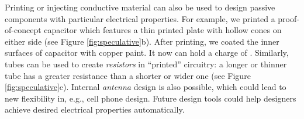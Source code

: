 Printing or injecting conductive material can also be used to design passive components with particular electrical properties. For example, we printed a proof-of-concept  capacitor which features a thin printed plate with hollow cones on either side (see Figure \ref{fig:speculative}b).  After printing, we coated the inner surfaces of capacitor with copper paint.  It now can hold a charge of .  Similarly, tubes can be used to create \emph{resistors} in ``printed'' circuitry: a longer or thinner tube has a greater resistance than a shorter or wider one (see Figure \ref{fig:speculative}c).  Internal \emph{antenna} design is also possible, which could lead to new flexibility in, e.g., cell phone design. Future design tools could help designers achieve desired electrical properties automatically.
